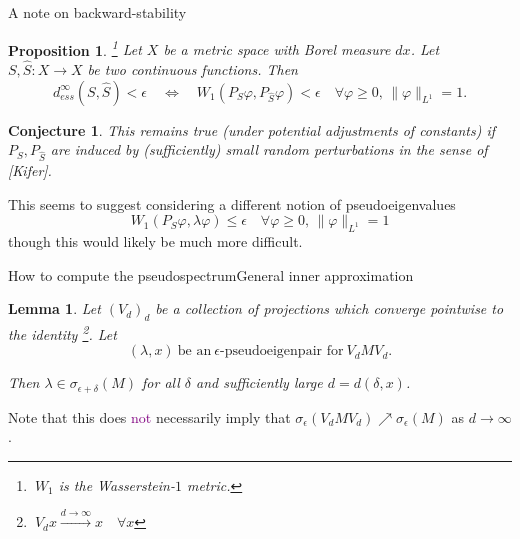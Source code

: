 \documentclass[
  english,            %
  aspectratio=169,    %
]{tumbeamer}
\newtheorem{lemma}{Lemma}
\newtheorem{proposition}{Proposition}
\newtheorem{conjecture}{Conjecture}
\newenvironment{emphbox}
  {\begin{tcolorbox}[colback=blue!5!white,colframe=blue!75!black]}
  {\end{tcolorbox}}
\renewcommand{\emph}[1]{\textcolor{purple}{#1}}
\begin{document}
\begin{frame}{A note on backward-stability}
  
\begin{proposition}
  \footnote{$\ W_1$ is the Wasserstein-$1$ metric.}
  Let $X$ be a metric space with Borel measure $dx$. Let $S,\hat{S} : X \to X$ be two continuous functions. Then 
  \begin{equation}
    d_{ess}^\infty (S, \hat{S}) < \epsilon 
    \quad \Leftrightarrow \quad 
    W_1 (P_S \varphi, P_{\hat{S}} \varphi) < \epsilon \quad \forall \varphi \geq 0,\, \| \varphi \|_{L^1} = 1 . 
  \end{equation} 
\end{proposition}

\begin{conjecture}
  This remains true (under potential adjustments of constants) if $P_S, P_{\hat{S}}$ are induced by (sufficiently) small random perturbations in the sense of [Kifer]. 
\end{conjecture}

\begin{emphbox}
  This seems to suggest considering a different notion of pseudoeigenvalues
  \begin{equation}
    W_1 ( P_S \varphi, \lambda \varphi ) \leq \epsilon \quad \forall \varphi \geq 0,\, \| \varphi \|_{L^1} = 1 
  \end{equation}
  though this would likely be much more difficult. 
\end{emphbox}

\end{frame}

\begin{frame}{How to compute the pseudospectrum}{General inner approximation}
  
\begin{lemma}
  Let $(V_d)_d$ be a collection of projections which converge pointwise to the identity \footnote{$\ V_d x \xrightarrow{d \to \infty} x \quad \forall x$}. Let 
  \begin{equation}
    (\lambda, x)\ \text{be an}\ \epsilon \text{-pseudoeigenpair for}\ V_d M V_d. 
  \end{equation}
  
  Then $\lambda \in \sigma_{\epsilon + \delta} (M)$ for all $\delta$ and sufficiently large $d = d(\delta, x)$. 
\end{lemma}

\begin{emphbox}
  Note that this does \emph{not} necessarily imply that $\sigma_\epsilon (V_d M V_d) \nearrow \sigma_\epsilon (M)$ as $d \to \infty$.  
\end{emphbox}

\end{frame}
\end{document}
